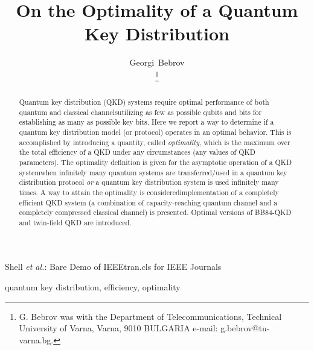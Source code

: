 \documentclass[journal,onecolumn]{IEEEtran}
\theoremstyle{thmstyleone}%
\theoremstyle{thmstyletwo}%
\theoremstyle{thmstylethree}%
\begin{document}
		\title{On the Optimality of a Quantum Key Distribution}
		
		\author{Georgi~Bebrov
			
			\thanks{G. Bebrov was with the Department
				of Telecommunications, Technical University of Varna, Varna, 9010 BULGARIA e-mail: g.bebrov@tu-varna.bg.}%
			}
		
	
	
	
	{Shell \MakeLowercase{\textit{et al.}}: Bare Demo of IEEEtran.cls for IEEE Journals}
	
	
	
	
	
	
	
	
	
	
	
	\maketitle
	
	\begin{abstract}
		Quantum key distribution (QKD) systems require optimal performance of both quantum and classical channels\textemdash utilizing as few as possible qubits and bits for establishing as many as possible key bits. Here we report a way to determine if a quantum key distribution model (or protocol) operates in an optimal behavior. This is accomplished by introducing a quantity, called \textit{optimality}, which is the maximum over the total efficiency of a QKD under any circumstances (any values of QKD parameters). The optimality definition is given for the asymptotic operation of a QKD system\textemdash when infinitely many quantum systems are transferred/used in a quantum key distribution protocol \textit{or} a quantum key distribution system is used infinitely many times. A way to attain the optimality is considered\textemdash implementation of a completely efficient QKD system (a combination of capacity-reaching quantum channel and a completely compressed classical channel) is presented. Optimal versions of BB84-QKD and twin-field QKD are introduced.
	\end{abstract}
	
	\begin{IEEEkeywords}
	quantum key distribution, efficiency, optimality
	\end{IEEEkeywords}
	
	
	
	
	
	
	\IEEEpeerreviewmaketitle
	
\end{document}
